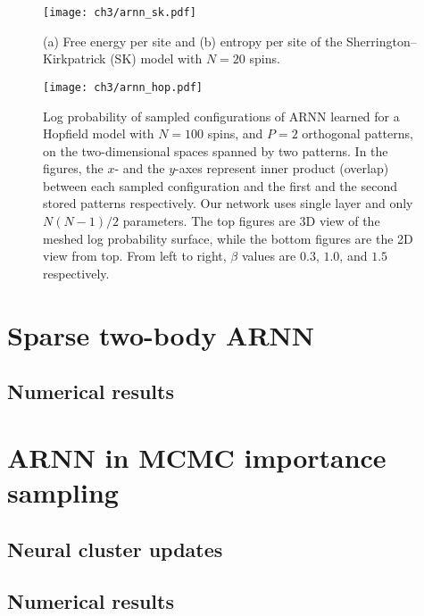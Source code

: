 \begin{figure}[htb]
\centering
\texttt{[image: ch3/arnn\_sk.pdf]}
\caption[ARNN results of Sherrington--Kirkpatrick model]{
(a) Free energy per site and (b) entropy per site of the Sherrington--Kirkpatrick (SK) model with $N = 20$ spins.
}
\label{fig:arnn-sk}
\end{figure}

\begin{figure}[htb]
\centering
\texttt{[image: ch3/arnn\_hop.pdf]}
\caption[ARNN results of Hopfield model]{
Log probability of sampled configurations of ARNN learned for a Hopfield model with $N = 100$ spins, and $P = 2$ orthogonal patterns, on the two-dimensional spaces spanned by two patterns. In the figures, the $x$- and the $y$-axes represent inner product (overlap) between each sampled configuration and the first and the second stored patterns respectively. Our network uses single layer and only $N (N - 1) / 2$ parameters. The top figures are 3D view of the meshed log probability surface, while the bottom figures are the 2D view from top. From left to right, $\beta$ values are $0.3$, $1.0$, and $1.5$ respectively.
}
\label{fig:arnn-hop}
\end{figure}

\section{Sparse two-body ARNN}

\cite{biazzo2024sparse}

\subsection{Numerical results}

\section{ARNN in MCMC importance sampling}

\subsection{Neural cluster updates}
\label{sec:ncus}

\cite{wu2021unbiased}

\subsection{Numerical results}
